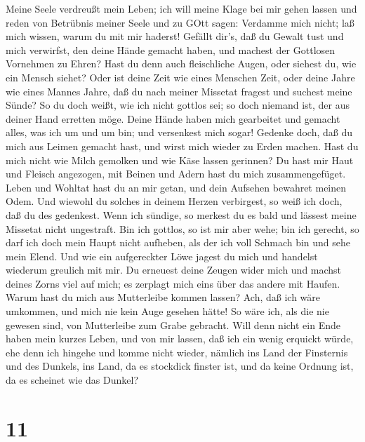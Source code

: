  Meine Seele verdreußt mein Leben; ich will meine Klage bei
mir gehen lassen und reden von Betrübnis meiner Seele  und
zu GOtt sagen: Verdamme mich nicht; laß mich wissen, warum du mit mir
haderst!  Gefällt dir's, daß du Gewalt tust und mich
verwirfst, den deine Hände gemacht haben, und machest der Gottlosen
Vornehmen zu Ehren?  Hast du denn auch fleischliche Augen,
oder siehest du, wie ein Mensch siehet?  Oder ist deine Zeit
wie eines Menschen Zeit, oder deine Jahre wie eines Mannes Jahre,
 daß du nach meiner Missetat fragest und suchest meine
Sünde?  So du doch weißt, wie ich nicht gottlos sei; so doch
niemand ist, der aus deiner Hand erretten möge.  Deine Hände
haben mich gearbeitet und gemacht alles, was ich um und um bin; und
versenkest mich sogar!  Gedenke doch, daß du mich aus Leimen
gemacht hast, und wirst mich wieder zu Erden machen.  Hast
du mich nicht wie Milch gemolken und wie Käse lassen gerinnen?
 Du hast mir Haut und Fleisch angezogen, mit Beinen und
Adern hast du mich zusammengefüget.  Leben und Wohltat hast
du an mir getan, und dein Aufsehen bewahret meinen Odem. 
Und wiewohl du solches in deinem Herzen verbirgest, so weiß ich doch,
daß du des gedenkest.  Wenn ich sündige, so merkest du es
bald und lässest meine Missetat nicht ungestraft.  Bin ich
gottlos, so ist mir aber wehe; bin ich gerecht, so darf ich doch mein
Haupt nicht aufheben, als der ich voll Schmach bin und sehe mein Elend.
 Und wie ein aufgereckter Löwe jagest du mich und handelst
wiederum greulich mit mir.  Du erneuest deine Zeugen wider
mich und machst deines Zorns viel auf mich; es zerplagt mich eins über
das andere mit Haufen.  Warum hast du mich aus Mutterleibe
kommen lassen? Ach, daß ich wäre umkommen, und mich nie kein Auge
gesehen hätte!  So wäre ich, als die nie gewesen sind, von
Mutterleibe zum Grabe gebracht.  Will denn nicht ein Ende
haben mein kurzes Leben, und von mir lassen, daß ich ein wenig erquickt
würde,  ehe denn ich hingehe und komme nicht wieder,
nämlich ins Land der Finsternis und des Dunkels,  ins Land,
da es stockdick finster ist, und da keine Ordnung ist, da es scheinet
wie das Dunkel?

\hypertarget{section-10}{%
\section{11}\label{section-10}}


